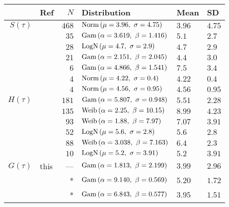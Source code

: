\centering
{\small
\begin{tabular}{rlrlll}
	\toprule
	          & Ref                 &   $N$ & Distribution                           & Mean   & SD     \\
	\midrule
	$S(\tau)$ & \citet{Du2020}       & $468$ & $\mathop{\mathrm{Norm}}{\left(\mu=3.96,~\sigma=4.75\right)}$     & $3.96$ & $4.75$ \\
	          & \citet{Zhang2020}    &  $35$ & $\mathop{\mathrm{Gam}}{\left(\alpha=3.619,~\beta=1.416\right)}$  & $5.1$  & $2.7$  \\
	          & \citet{Nishiura2020} &  $28$ & $\mathop{\mathrm{LogN}}{\left(\mu=4.7,~\sigma=2.9\right)}$       & $4.7$  & $2.9$  \\
	          & \citet{Zhao2020}     &  $21$ & $\mathop{\mathrm{Gam}}{\left(\alpha=2.151,~\beta=2.045\right)}$  & $4.4$  & $3.0$  \\
	          & \citet{Li2020}       &   $6$ & $\mathop{\mathrm{Gam}}{\left(\alpha=4.866,~\beta=1.541\right)}$  & $7.5$  & $3.4$  \\
	          & \citet{Tindale2020}  &   $4$ & $\mathop{\mathrm{Norm}}{\left(\mu=4.22,~\sigma=0.4\right)}$      & $4.22$ & $0.4$  \\
	          & \citet{Tindale2020}  &   $4$ & $\mathop{\mathrm{Norm}}{\left(\mu=4.56,~\sigma=0.95\right)}$     & $4.56$ & $0.95$ \\
	\midrule
	$H(\tau)$ & \citet{Lauer2020}    & $181$ & $\mathop{\mathrm{Gam}}{\left(\alpha=5.807,~\sigma=0.948\right)}$ & $5.51$ & $2.28$ \\
	          & \citet{Tindale2020}  & $135$ & $\mathop{\mathrm{Weib}}{\left(\alpha=2.25,~\beta=10.15\right)}$  & $8.99$ & $4.23$ \\
	          & \citet{Tindale2020}  &  $93$ & $\mathop{\mathrm{Weib}}{\left(\alpha=1.88,~\beta=7.97\right)}$   & $7.07$ & $3.91$ \\
	          & \citet{Linton2020}   &  $52$ & $\mathop{\mathrm{LogN}}{\left(\mu=5.6,~\sigma=2.8\right)}$       & $5.6$  & $2.8$  \\
	          & \citet{Backer2020}   &  $88$ & $\mathop{\mathrm{Weib}}{\left(\alpha=3.038,~\beta=7.163\right)}$ & $6.4$  & $2.3$  \\
	          & \citet{Li2020}       &  $10$ & $\mathop{\mathrm{LogN}}{\left(\mu=5.2,~\sigma=3.91\right)}$      & $5.2$  & $3.91$ \\
	\midrule
	$G(\tau)$ & this                 &   --- & $\mathop{\mathrm{Gam}}{\left(\alpha=1.813,~\beta=2.199\right)}$  & $3.99$ & $2.96$ \\
	          & \citet{Ganyani2020}  &     * & $\mathop{\mathrm{Gam}}{\left(\alpha=9.140,~\beta=0.569\right)}$  & $5.20$ & $1.72$ \\
	          & \citet{Ganyani2020}  &     * & $\mathop{\mathrm{Gam}}{\left(\alpha=6.843,~\beta=0.577\right)}$  & $3.95$ & $1.51$ \\
	\bottomrule
\end{tabular}}
